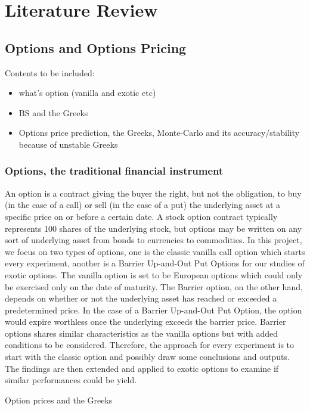 \documentclass{report}
\begin{document}
\chapter{Literature Review}

\section{Options and Options Pricing}

Contents to be included:
\begin{itemize}
\item what's option (vanilla and exotic etc)
\item BS and the Greeks
\item Options price prediction, the Greeks, Monte-Carlo and its accuracy/stability because of unstable Greeks
\end{itemize}

\subsection{Options, the traditional financial instrument}
An option is a contract giving the buyer the right, but not the obligation, to buy (in the case of a call) or sell (in the case of a put) the underlying asset at a specific price on or before a certain date. A stock option contract typically represents 100 shares of the underlying stock, but options may be written on any sort of underlying asset from bonds to currencies to commodities.
In this project, we focus on two types of options, one is the classic vanilla call option which starts every experiment, another is a Barrier Up-and-Out Put Options for our studies of exotic options. The vanilla option is set to be European options which could only be exercised only on the date of maturity. The Barrier option, on the other hand, depends on whether or not the underlying asset has reached or exceeded a predetermined price. In the case of a Barrier Up-and-Out Put Option, the option would expire worthless once the underlying exceeds the barrier price. Barrier options shares similar characteristics as the vanilla options but with added conditions to be considered. Therefore, the approach for every experiment is to start with the classic option and possibly draw some conclusions and outputs. The findings are then extended and applied to exotic options to examine if similar performances could be yield. 

Option prices and the Greeks
\end{document}
